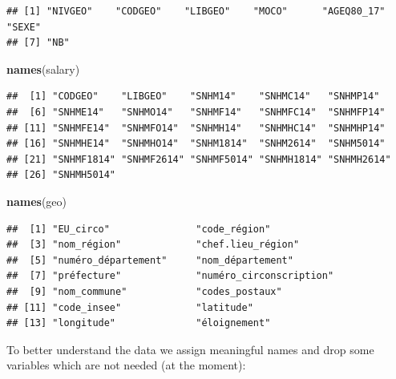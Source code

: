 \documentclass[]{article}
\newenvironment{Shaded}{\begin{snugshade}}{\end{snugshade}}
\newcommand{\KeywordTok}[1]{\textcolor[rgb]{0.13,0.29,0.53}{\textbf{#1}}}
\newcommand{\NormalTok}[1]{#1}
\begin{document}
\begin{verbatim}
## [1] "NIVGEO"    "CODGEO"    "LIBGEO"    "MOCO"      "AGEQ80_17" "SEXE"     
## [7] "NB"
\end{verbatim}

\begin{Shaded}
\begin{Highlighting}[]
\KeywordTok{names}\NormalTok{(salary)}
\end{Highlighting}
\end{Shaded}

\begin{verbatim}
##  [1] "CODGEO"    "LIBGEO"    "SNHM14"    "SNHMC14"   "SNHMP14"  
##  [6] "SNHME14"   "SNHMO14"   "SNHMF14"   "SNHMFC14"  "SNHMFP14" 
## [11] "SNHMFE14"  "SNHMFO14"  "SNHMH14"   "SNHMHC14"  "SNHMHP14" 
## [16] "SNHMHE14"  "SNHMHO14"  "SNHM1814"  "SNHM2614"  "SNHM5014" 
## [21] "SNHMF1814" "SNHMF2614" "SNHMF5014" "SNHMH1814" "SNHMH2614"
## [26] "SNHMH5014"
\end{verbatim}

\begin{Shaded}
\begin{Highlighting}[]
\KeywordTok{names}\NormalTok{(geo)}
\end{Highlighting}
\end{Shaded}

\begin{verbatim}
##  [1] "EU_circo"               "code_région"           
##  [3] "nom_région"             "chef.lieu_région"      
##  [5] "numéro_département"     "nom_département"       
##  [7] "préfecture"             "numéro_circonscription"
##  [9] "nom_commune"            "codes_postaux"         
## [11] "code_insee"             "latitude"              
## [13] "longitude"              "éloignement"
\end{verbatim}

To better understand the data we assign meaningful names and drop some
variables which are not needed (at the moment):
\end{document}
